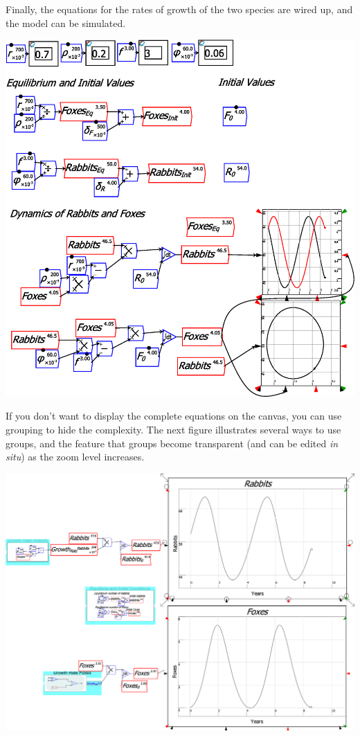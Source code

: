 Finally, the equations for the rates of growth of the two species
are wired up, and the model can be simulated.

\noindent\includegraphics[width=\textwidth]{images/PredatorPreyRabbitsFoxes04Equations}

If you don't want to display the complete equations on the canvas,
you can use grouping to hide the complexity. The next figure illustrates
several ways to use groups, and the feature that groups become transparent
(and can be edited \emph{in situ}) as the zoom level increases.

\noindent\includegraphics[width=\textwidth]{images/PredatorPreyRabbitsFoxes05Grouping}

